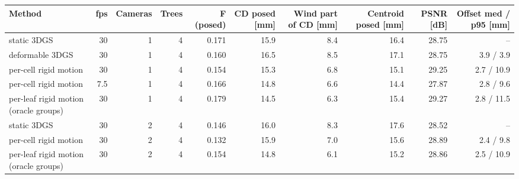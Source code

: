\begin{tabular}{lrrrrrrrrr}
\toprule
Method & fps & Cameras & Trees & F (posed) & CD posed [mm] & Wind part of CD [mm] & Centroid posed [mm] & PSNR [dB] & Offset med / p95 [mm] \\
\midrule
static 3DGS & 30 & 1 & 4 & 0.171 & 15.9 & 8.4 & 16.4 & 28.75 & -- \\
deformable 3DGS & 30 & 1 & 4 & 0.160 & 16.5 & 8.5 & 17.1 & 28.75 & 3.9 / 3.9 \\
per-cell rigid motion & 30 & 1 & 4 & 0.154 & 15.3 & 6.8 & 15.1 & 29.25 & 2.7 / 10.9 \\
per-cell rigid motion & 7.5 & 1 & 4 & 0.166 & 14.8 & 6.6 & 14.4 & 27.87 & 2.8 / 9.6 \\
per-leaf rigid motion (oracle groups) & 30 & 1 & 4 & 0.179 & 14.5 & 6.3 & 15.4 & 29.27 & 2.8 / 11.5 \\
\midrule
static 3DGS & 30 & 2 & 4 & 0.146 & 16.0 & 8.3 & 17.6 & 28.52 & -- \\
per-cell rigid motion & 30 & 2 & 4 & 0.132 & 15.9 & 7.0 & 15.6 & 28.89 & 2.4 / 9.8 \\
per-leaf rigid motion (oracle groups) & 30 & 2 & 4 & 0.154 & 14.8 & 6.1 & 15.2 & 28.86 & 2.5 / 10.9 \\
\bottomrule
\end{tabular}
